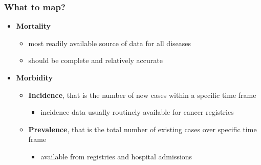 \documentclass[12pt]{beamer}
\begin{document}
\begin{frame}
    \frametitle{What to map?}
\begin{itemize} \setlength\itemsep{\fill}
\item \textbf{Mortality}
    \begin{itemize} \setlength\itemsep{\fill}
    \item  most readily available source of data for all diseases
    \item  should be complete and relatively accurate
    \end{itemize}
\item \textbf{Morbidity}
	\begin{itemize} \setlength\itemsep{\fill}
    \item  \textbf{Incidence}, that is the number of new cases within a specific time frame
    \begin{itemize} \setlength\itemsep{\fill}
    \item  incidence data usually routinely available for cancer registries
    \end{itemize}
	\item \textbf{Prevalence}, that is the total number of existing cases over specific time frame
    \begin{itemize} \setlength\itemsep{\fill}
    \item  available from registries and hospital admissions
    \end{itemize}
\end{itemize}
    \end{itemize}
\end{frame}
\end{document}
